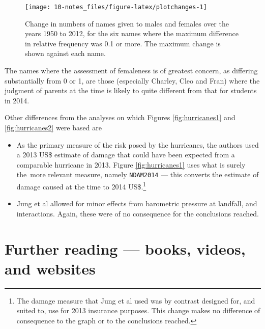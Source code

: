 \documentclass[
  10pt,
  b5paper]{book}
\providecommand{\tightlist}{%
  \setlength{\itemsep}{0pt}\setlength{\parskip}{0pt}}
\begin{document}
\begin{figure}

{\centering \texttt{[image: 10-notes\_files/figure-latex/plotchanges-1]} 

}

\caption{Change in numbers of names given to males and females
over the years 1950 to 2012, for the six names where the 
maximum difference in relative frequency was 0.1 or more.
The maximum change is shown against each name.}\label{fig:plotchanges}
\end{figure}

The names where the assessment of femaleness is of greatest concern,
as differing substantially from 0 or 1, are those (especially Charley,
Cleo and Fran) where the judgment of parents at the time is likely to
quite different from that for students in 2014.

\enlargethispage{21pt}

Other differences from the analyses on which Figures
\ref{fig:hurricanes1} and \ref{fig:hurricanes2} were based
are

\begin{itemize}
\tightlist
\item
  As the primary measure of the risk posed by the hurricanes, the
  authors used a 2013 US\$ estimate of damage that could have been
  expected from a comparable hurricane in 2013. Figure
  \ref{fig:hurricanes1} uses what is surely the~more relevant
  measure, namely \texttt{NDAM2014} --- this converts the estimate of
  damage caused at the time to 2014 US\$.\footnote{The damage measure that
    Jung et al used was by contrast designed for, and suited to, use
    for 2013 insurance purposes. This change makes no difference of
    consequence to the graph or to the conclusions reached.}
\item
  Jung et al allowed for minor effects from barometric pressure
  at landfall, and interactions. Again, these were of no
  consequence for the conclusions reached.
\end{itemize}

\backmatter

\hypertarget{further-reading-books-videos-and-websites}{%
\chapter*{Further reading --- books, videos, and websites}\label{further-reading-books-videos-and-websites}}
\end{document}
